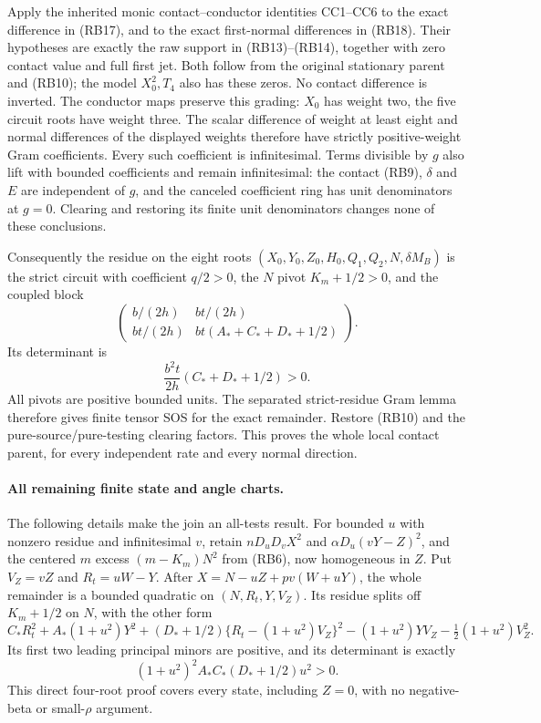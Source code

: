Apply the inherited monic contact--conductor identities CC1--CC6 to
the exact difference in (RB17), and to the exact first-normal
differences in (RB18). Their hypotheses are exactly the raw support in
(RB13)--(RB14), together with zero contact value and full first jet.
Both follow from the original stationary parent and (RB10); the model
$X_0^2,T_4$ also has these zeros. No contact difference is inverted.
The conductor maps preserve this grading: $X_0$ has weight two,
the five circuit roots have weight three. The scalar difference of
weight at least eight and normal differences of the displayed weights
therefore have strictly positive-weight Gram coefficients. Every such
coefficient is infinitesimal. Terms divisible by $g$ also lift with
bounded coefficients and remain infinitesimal: the contact (RB9),
$\delta$ and $E$ are independent of $g$, and the canceled coefficient
ring has unit denominators at $g=0$. Clearing and restoring its finite
unit denominators changes none of these conclusions.

Consequently the residue on the eight roots
$(X_0,Y_0,Z_0,H_0,Q_1,Q_2,N,\delta M_B)$ is the strict circuit with
coefficient $q/2>0$, the $N$ pivot $K_m+1/2>0$, and the coupled block
\[
 \begin{pmatrix}
 b/(2h)&bt/(2h)\\
 bt/(2h)&bt(A_*+C_*+D_*+1/2)
 \end{pmatrix}.                                    \tag{RB20}
\]
Its determinant is
\[
 \frac{b^2t}{2h}(C_*+D_*+1/2)>0.                    \tag{RB21}
\]
All pivots are positive bounded units. The separated strict-residue
Gram lemma therefore gives finite tensor SOS for the exact remainder.
Restore (RB10) and the pure-source/pure-testing clearing factors.
This proves the whole local contact parent, for every independent rate
and every normal direction.

\paragraph{All remaining finite state and angle charts.}
The following details make the join an all-tests result.
For bounded $u$ with nonzero residue and infinitesimal $v$, retain
$nD_uD_vX^2$ and $\alpha D_u(vY-Z)^2$, and the centered $m$ excess
$(m-K_m)N^2$ from (RB6), now homogeneous in $Z$. Put
$V_Z=vZ$ and $R_t=uW-Y$. After $X=N-uZ+pv(W+uY)$, the whole
remainder is a bounded quadratic on $(N,R_t,Y,V_Z)$. Its residue
splits off $K_m+1/2$ on $N$, with the other form
\[
 C_*R_t^2+A_*(1+u^2)Y^2
 +(D_*+1/2)\{R_t-(1+u^2)V_Z\}^2
 -(1+u^2)YV_Z-\tfrac12(1+u^2)V_Z^2.               \tag{RB22}
\]
Its first two leading principal minors are positive, and its determinant
is exactly
\[
 (1+u^2)^2A_*C_*(D_*+1/2)u^2>0.                    \tag{RB23}
\]
This direct four-root proof covers every state, including $Z=0$, with
no negative-beta or small-$\rho$ argument.

